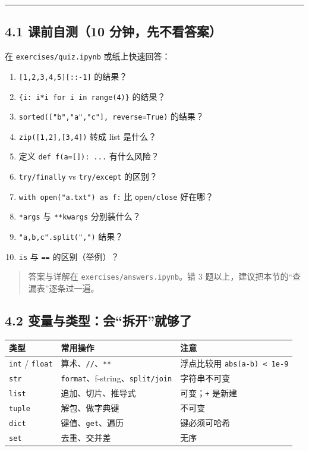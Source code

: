 \begin{center}\rule{0.5\linewidth}{0.5pt}\end{center}

\subsection{4.1 课前自测（10
分钟，先不看答案）}\label{ux8bfeux524dux81eaux6d4b10-ux5206ux949fux5148ux4e0dux770bux7b54ux6848}

在 \texttt{exercises/quiz.ipynb} 或纸上快速回答：

\begin{enumerate}
\def\labelenumi{\arabic{enumi}.}
\tightlist
\item
  \texttt{{[}1,2,3,4,5{]}{[}::-1{]}} 的结果？
\item
  \texttt{\{i:\ i*i\ for\ i\ in\ range(4)\}} 的结果？
\item
  \texttt{sorted({[}"b","a","c"{]},\ reverse=True)} 的结果？
\item
  \texttt{zip({[}1,2{]},{[}3,4{]})} 转成 list 是什么？
\item
  定义 \texttt{def\ f(a={[}{]}):\ ...} 有什么风险？
\item
  \texttt{try/finally} vs \texttt{try/except} 的区别？
\item
  \texttt{with\ open("a.txt")\ as\ f:} 比 \texttt{open/close} 好在哪？
\item
  \texttt{*args} 与 \texttt{**kwargs} 分别装什么？
\item
  \texttt{"a,b,c".split(",")} 结果？
\item
  \texttt{is} 与 \texttt{==} 的区别（举例）？
\end{enumerate}

\begin{quote}
答案与详解在 \texttt{exercises/answers.ipynb}。错 3
题以上，建议把本节的``查漏表''逐条过一遍。
\end{quote}

\subsection{4.2
变量与类型：会``拆开''就够了}\label{ux53d8ux91cfux4e0eux7c7bux578bux4f1aux62c6ux5f00ux5c31ux591fux4e86}

{\def\LTcaptype{none} %
\begin{longtable}[]{@{}lll@{}}
\toprule\noalign{}
类型 & 常用操作 & 注意 \\
\midrule\noalign{}
\endhead
\bottomrule\noalign{}
\endlastfoot
\texttt{int} / \texttt{float} & 算术、\texttt{//}、\texttt{**} &
浮点比较用 \texttt{abs(a-b)\ \textless{}\ 1e-9} \\
\texttt{str} & \texttt{format}、f-string、\texttt{split/join} &
字符串不可变 \\
\texttt{list} & 追加、切片、推导式 & 可变；\texttt{+} 是新建 \\
\texttt{tuple} & 解包、做字典键 & 不可变 \\
\texttt{dict} & 键值、\texttt{get}、遍历 & 键必须可哈希 \\
\texttt{set} & 去重、交并差 & 无序 \\
\end{longtable}
}


